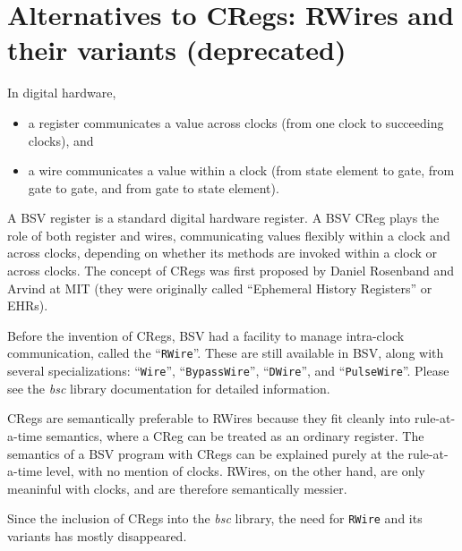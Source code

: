 \Endexercise


\section{Alternatives to CRegs: RWires and their variants (deprecated)}

\label{Sec_RWires}

In digital hardware,

\begin{itemize}

 \item a register communicates a value across clocks (from one clock to succeeding clocks), and

 \item a wire communicates a value within a clock (from state element
       to gate, from gate to gate, and from gate to state element).

\end{itemize}

A BSV register is a standard digital hardware register.  A BSV CReg
plays the role of both register and wires, communicating values
flexibly within a clock and across clocks, depending on whether its
methods are invoked within a clock or across clocks.  The concept of
CRegs was first proposed by Daniel Rosenband and Arvind at MIT
\cite{RosenbandMEMOCODE04, Rosenband2005b} (they were originally
called ``Ephemeral History Registers'' or EHRs).

Before the invention of CRegs, BSV had a facility to manage
intra-clock communication, called the ``\verb|RWire|''.  These are
still available in BSV, along with several specializations:
``\verb|Wire|'', ``\verb|BypassWire|'', ``\verb|DWire|'', and
``\verb|PulseWire|''.  Please see the \emph{bsc} library documentation
for detailed information.

CRegs are semantically preferable to RWires because they fit cleanly
into rule-at-a-time semantics, where a CReg can be treated as an
ordinary register.  The semantics of a BSV program with CRegs can be
explained purely at the rule-at-a-time level, with no mention of
clocks.  RWires, on the other hand, are only meaninful with clocks,
and are therefore semantically messier.

Since the inclusion of CRegs into the \emph{bsc} library, the need for
\verb|RWire| and its variants has mostly disappeared.

